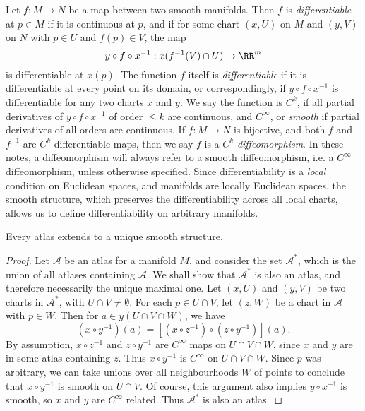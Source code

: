 Let $f:M \to N$ be a map between two smooth manifolds. Then $f$ is \emph{differentiable} at $p \in M$ if it is continuous at $p$, and if for some chart $(x,U)$ on $M$ and $(y,V)$ on $N$ with $p \in U$ and $f(p) \in V$, the map
%
\[ y \circ f \circ x^{-1}: x(f^{-1}(V) \cap U) \to \RR^m \]
%
is differentiable at $x(p)$. The function $f$ itself is \emph{differentiable} if it is differentiable at every point on its domain, or correspondingly, if $y \circ f \circ x^{-1}$ is differentiable for any two charts $x$ and $y$. We say the function is $C^k$, if all partial derivatives of $y \circ f \circ x^{-1}$ of order $\leq k$ are continuous, and $C^\infty$, or \emph{smooth} if partial derivatives of all orders are continuous. If $f: M \to N$ is bijective, and both $f$ and $f^{-1}$ are $C^k$ differentiable maps, then we say $f$ is a $C^k$ \emph{diffeomorphism}. In these notes, a diffeomorphism will always refer to a smooth diffeomorphism, i.e. a $C^\infty$ diffeomorphism, unless otherwise specified. Since differentiability is a {\it local} condition on Euclidean spaces, and manifolds are locally Euclidean spaces, the smooth structure, which preserves the differentiability across all local charts, allows us to define differentiability on arbitrary manifolds.

\begin{lemma}
    Every atlas extends to a unique smooth structure.
\end{lemma}
\begin{proof}
Let $\mathcal{A}$ be an atlas for a manifold $M$, and consider the set $\mathcal{A}^*$, which is the union of all atlases containing $\mathcal{A}$. We shall show that $\mathcal{A}^*$ is also an atlas, and therefore necessarily the unique maximal one. Let $(x,U)$ and $(y,V)$ be two charts in $\mathcal{A}^*$, with $U \cap V \neq \emptyset$. For each $p \in U \cap V$, let $(z,W)$ be a chart in $\mathcal{A}$ with $p \in W$. Then for $a \in y(U \cap V \cap W)$, we have
%
\[ (x \circ y^{-1})(a) = [(x \circ z^{-1}) \circ (z \circ y^{-1})](a). \]
%
By assumption, $x \circ z^{-1}$ and $z \circ y^{-1}$ are $C^\infty$ maps on $U \cap V \cap W$, since $x$ and $y$ are in some atlas containing $z$. Thus $x \circ y^{-1}$ is $C^\infty$ on $U \cap V \cap W$. Since $p$ was arbitrary, we can take unions over all neighbourhoods $W$ of points to conclude that $x \circ y^{-1}$ is smooth on $U \cap V$. Of course, this argument also implies $y \circ x^{-1}$ is smooth, so $x$ and $y$ are $C^\infty$ related. Thus $\mathcal{A}^*$ is also an atlas.
\end{proof}


